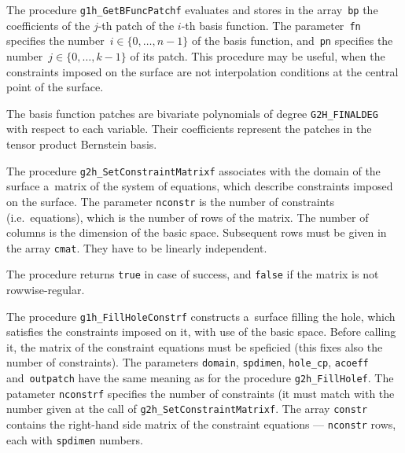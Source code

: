 \vspace{\bigskipamount}
The procedure \texttt{g1h\_GetBFuncPatchf} evaluates and stores in the
array~\texttt{bp} the coefficients
of the $j$-th patch of the $i$-th basis function. The parameter~\texttt{fn}
specifies the number~$i\in\{0,\ldots,n-1\}$ of the basis function,
and~\texttt{pn} specifies the number~$j\in\{0,\ldots,k-1\}$ of its patch.
This procedure may be useful, when the constraints imposed on the surface
are not interpolation conditions at the central point of the surface.

The basis function patches are bivariate polynomials of degree
\texttt{G2H\_FINALDEG} with respect to each variable. Their coefficients
represent the patches in the tensor product Bernstein basis.

The procedure \texttt{g2h\_SetConstraintMatrixf} associates with the domain
of the surface a~matrix of the system of equations, which describe constraints
imposed on the surface. The parameter \texttt{nconstr} is the number of
constraints (i.e.\ equations), which is the number of rows of the matrix.
The number of columns is the dimension of the basic space.
Subsequent rows must be given in the array \texttt{cmat}. They have to be
linearly independent.

The procedure returns \texttt{true} in case of success, and \texttt{false}
if the matrix is not rowwise-regular.

\vspace{\bigskipamount}
The procedure \texttt{g1h\_FillHoleConstrf} constructs a~surface filling the
hole, which satisfies the constraints imposed on it, with use of the
basic space. Before calling it, the matrix of the constraint equations
must be speficied (this fixes also the number of constraints).
The parameters \texttt{domain}, \texttt{spdimen},
\texttt{hole\_cp}, \texttt{acoeff} and~\texttt{outpatch} have the same meaning as
for the procedure \texttt{g2h\_FillHolef}. The patameter \texttt{nconstrf}
specifies the number of constraints (it must match with the number given
at the call of \texttt{g2h\_SetConstraintMatrixf}. The array \texttt{constr}
contains the right-hand side matrix of the constraint equations
--- \texttt{nconstr} rows, each with \texttt{spdimen} numbers.

